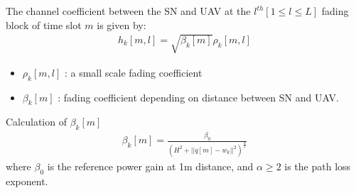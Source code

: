 \documentclass{beamer}
\providecommand{\brak}[1]{\ensuremath{\left(#1\right)}}
\begin{document}
\begin{frame}
\begin{block}{}
The channel coefficient between the SN and UAV at the $l^{th} [1 \leq l \leq L]$ fading block of time slot $m$ is given by:
\begin{align}
    h_k[m,l]=\sqrt{\beta_k[m]}\rho_k[m,l]\label{chan co}
\end{align}
\begin{itemize}
    \item $\rho_k[m,l]$ : a small scale fading coefficient
    \item $\beta_k[m]$ : fading coefficient depending on distance between SN and UAV.
\end{itemize}
\end{block}
\begin{block}{Calculation of $\beta_k[m]$}
\begin{align}
    \beta_k[m]=\frac{\beta_0}{\brak{H^2+||q[m]-w_k||^2}^\frac{\alpha}{2}}\label{beta}
\end{align}
where $\beta_0$ is the reference power gain at 1m distance, and $\alpha \geq 2$ is the path loss exponent. 
\end{block}
\end{frame}
\end{document}
